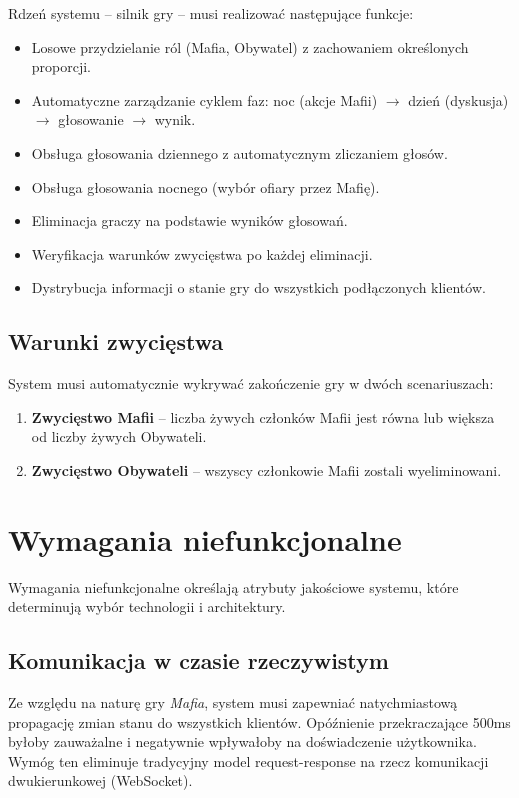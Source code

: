 ﻿\documentclass[a4paper,twoside,11pt]{mwrep}
\theoremstyle{plain} \newtheorem{thm}{Twierdzenie}
\theoremstyle{plain} \newtheorem{lem}{Lemat}
\theoremstyle{definition} \newtheorem{defn}{Definicja}
\theoremstyle{remark} \newtheorem*{rem}{Wniosek}
\begin{document}
Rdzeń systemu -- silnik gry -- musi realizować następujące funkcje:
\begin{itemize}
    \item Losowe przydzielanie ról (Mafia, Obywatel) z zachowaniem określonych proporcji.
    \item Automatyczne zarządzanie cyklem faz: noc (akcje Mafii) $\rightarrow$ dzień (dyskusja) $\rightarrow$ głosowanie $\rightarrow$ wynik.
    \item Obsługa głosowania dziennego z automatycznym zliczaniem głosów.
    \item Obsługa głosowania nocnego (wybór ofiary przez Mafię).
    \item Eliminacja graczy na podstawie wyników głosowań.
    \item Weryfikacja warunków zwycięstwa po każdej eliminacji.
    \item Dystrybucja informacji o stanie gry do wszystkich podłączonych klientów.
\end{itemize}

\subsection{Warunki zwycięstwa}

System musi automatycznie wykrywać zakończenie gry w dwóch scenariuszach:
\begin{enumerate}
    \item \textbf{Zwycięstwo Mafii} -- liczba żywych członków Mafii jest równa lub większa od liczby żywych Obywateli.
    \item \textbf{Zwycięstwo Obywateli} -- wszyscy członkowie Mafii zostali wyeliminowani.
\end{enumerate}

\section{Wymagania niefunkcjonalne}

Wymagania niefunkcjonalne określają atrybuty jakościowe systemu, które determinują wybór technologii i architektury.

\subsection{Komunikacja w czasie rzeczywistym}

Ze względu na naturę gry \textit{Mafia}, system musi zapewniać natychmiastową propagację zmian stanu do wszystkich klientów. Opóźnienie przekraczające 500ms byłoby zauważalne i negatywnie wpływałoby na doświadczenie użytkownika. Wymóg ten eliminuje tradycyjny model request-response na rzecz komunikacji dwukierunkowej (WebSocket).
\end{document}
